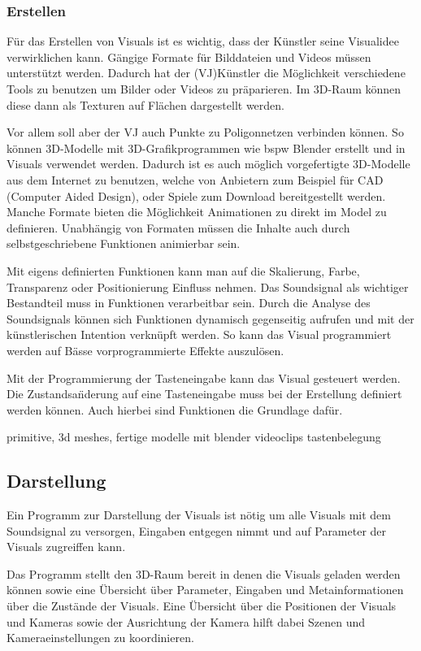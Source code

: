 \subsubsection{Erstellen}

F\"ur das Erstellen von Visuals ist es wichtig, dass der K\"unstler seine Visualidee verwirklichen kann. G\"angige 
Formate f\"ur Bilddateien und Videos m\"ussen unterst\"utzt werden. Dadurch hat der (VJ)K\"unstler die M\"oglichkeit
verschiedene Tools zu benutzen um Bilder oder Videos zu pr\"aparieren. Im 3D-Raum k\"onnen diese dann als Texturen auf
Fl\"achen dargestellt werden. 

Vor allem soll aber der VJ auch Punkte zu Poligonnetzen verbinden k\"onnen. So k\"onnen 3D-Modelle mit 3D-Grafikprogrammen
wie bspw Blender erstellt und in Visuals verwendet werden. Dadurch ist es auch m\"oglich vorgefertigte 3D-Modelle aus dem
Internet zu benutzen, welche von Anbietern zum Beispiel f\"ur CAD (Computer Aided Design), oder Spiele zum Download bereitgestellt 
werden. Manche Formate bieten die M\"oglichkeit Animationen zu direkt im Model zu definieren. Unabh\"angig von Formaten
m\"ussen die Inhalte auch durch selbstgeschriebene Funktionen animierbar sein. 

Mit eigens definierten Funktionen kann man auf die Skalierung, Farbe, Transparenz oder Positionierung Einfluss nehmen.
Das Soundsignal als wichtiger Bestandteil muss in Funktionen verarbeitbar sein. Durch die Analyse des Soundsignals k\"onnen 
sich Funktionen dynamisch gegenseitig aufrufen und mit der k\"unstlerischen Intention verkn\"upft werden. So kann das 
Visual programmiert werden auf B\"asse vorprogrammierte Effekte auszul\"osen.

Mit der Programmierung der Tasteneingabe kann das Visual gesteuert werden. Die Zustandsa\"nderung auf eine Tasteneingabe
muss bei der Erstellung definiert werden k\"onnen. Auch hierbei sind Funktionen die Grundlage daf\"ur.

primitive, 3d meshes, 
fertige modelle mit blender
videoclips
tastenbelegung


\subsection{Darstellung}

Ein Programm zur Darstellung der Visuals ist n\"otig um alle Visuals mit dem Soundsignal zu versorgen, Eingaben entgegen
nimmt und auf Parameter der Visuals zugreiffen kann. 


Das Programm stellt den 3D-Raum bereit in denen die Visuals geladen werden k\"onnen sowie eine \"Ubersicht \"uber
Parameter, Eingaben und Metainformationen \"uber die Zust\"ande der Visuals. Eine \"Ubersicht \"uber die Positionen
der Visuals und Kameras sowie der Ausrichtung der Kamera hilft dabei Szenen und Kameraeinstellungen zu koordinieren.

